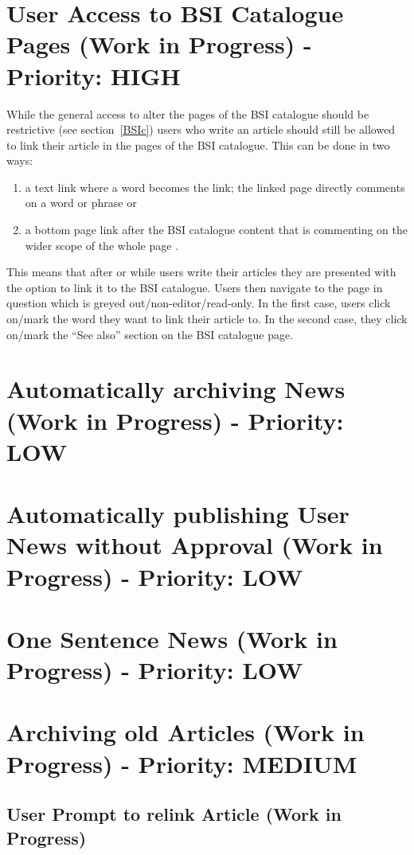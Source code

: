\section{User Access to BSI Catalogue Pages (Work in Progress) - Priority: HIGH}
While the general access to alter the pages of the BSI catalogue should be restrictive (see section~\ref{BSIc}) users who write an article should still be allowed to link their article in the pages of the BSI catalogue.
This can be done in two ways:
\begin{enumerate}
    \item a text link where a word becomes the link; the linked page directly comments on a word or phrase or
    \item a bottom page link after the BSI catalogue content that is commenting on the wider scope of the whole page
        .
\end{enumerate}
This means that after or while users write their articles they are presented with the option to link it to the BSI catalogue.
Users then navigate to the page in question which is greyed out/non-editor/read-only.
In the first case, users click on/mark the word they want to link their article to.
In the second case, they click on/mark the ``See also'' section on the BSI catalogue page.


\section{Automatically archiving News (Work in Progress) - Priority: LOW}



\section{Automatically publishing User News without Approval (Work in Progress) - Priority: LOW}



\section{One Sentence News (Work in Progress) - Priority: LOW}



\section{Archiving old Articles (Work in Progress) - Priority: MEDIUM}
\subsection{User Prompt to relink Article (Work in Progress)}

